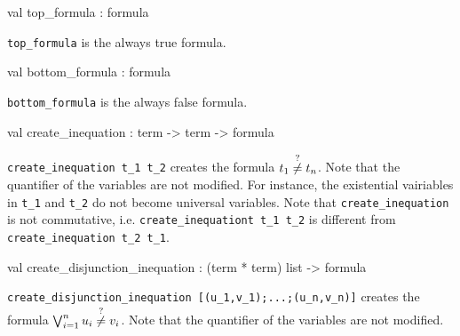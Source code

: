 \label{val:Term.top-underscoreformula}\begin{ocamldoccode}
val top_formula : formula
\end{ocamldoccode}
\begin{ocamldocdescription}
{\tt{top\_formula}} is the always true formula.


\end{ocamldocdescription}




\label{val:Term.bottom-underscoreformula}\begin{ocamldoccode}
val bottom_formula : formula
\end{ocamldoccode}
\begin{ocamldocdescription}
{\tt{bottom\_formula}} is the always false formula.


\end{ocamldocdescription}




\label{val:Term.create-underscoreinequation}\begin{ocamldoccode}
val create_inequation : term -> term -> formula
\end{ocamldoccode}
\begin{ocamldocdescription}
{\tt{create\_inequation t\_1 t\_2}} creates the formula $t_1 \stackrel{?}{\neq} t_n$. 
    Note that the quantifier of the variables are not modified. For instance, the existential vairiables
    in {\tt{t\_1}} and {\tt{t\_2}} do not become universal variables.
    Note that {\tt{create\_inequation}} is not commutative, i.e. {\tt{create\_inequationt t\_1 t\_2}} is different from
    {\tt{create\_inequation t\_2 t\_1}}.


\end{ocamldocdescription}




\label{val:Term.create-underscoredisjunction-underscoreinequation}\begin{ocamldoccode}
val create_disjunction_inequation : (term * term) list -> formula
\end{ocamldoccode}
\begin{ocamldocdescription}
{\tt{create\_disjunction\_inequation [(u\_1,v\_1);...;(u\_n,v\_n)]}} creates the formula $\bigvee_{i=1}^n u_i \stackrel{?}{\neq} v_i$. 
    Note that the quantifier of the variables are not modified.


\end{ocamldocdescription}




